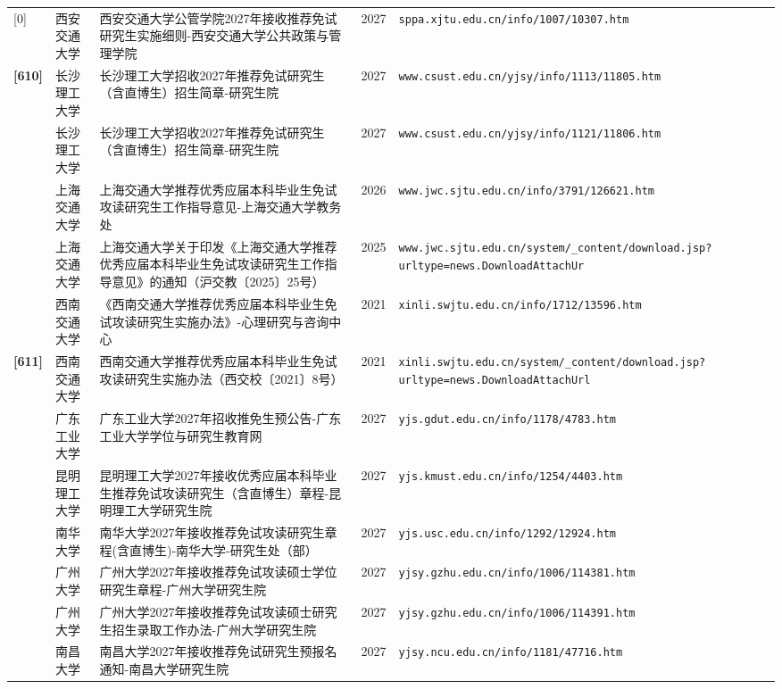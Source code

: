 {\begin{longtable}{@{}p{1.15cm}p{2.9cm}p{6.3cm}p{0.85cm}p{5.0cm}@{}}
[0] & 西安交通大学 & 西安交通大学公管学院2027年接收推荐免试研究生实施细则-西安交通大学公共政策与管理学院 & 2027 & \texttt{sppa.xjtu.edu.cn/info/1007/10307.htm} \\
\textbf{[610]} & 长沙理工大学 & 长沙理工大学招收2027年推荐免试研究生（含直博生）招生简章-研究生院 & 2027 & \texttt{www.csust.edu.cn/yjsy/info/1113/11805.htm} \\
[0] & 长沙理工大学 & 长沙理工大学招收2027年推荐免试研究生（含直博生）招生简章-研究生院 & 2027 & \texttt{www.csust.edu.cn/yjsy/info/1121/11806.htm} \\
[0] & 上海交通大学 & 上海交通大学推荐优秀应届本科毕业生免试攻读研究生工作指导意见-上海交通大学教务处 & 2026 & \texttt{www.jwc.sjtu.edu.cn/info/3791/126621.htm} \\
[0] & 上海交通大学 & 上海交通大学关于印发《上海交通大学推荐优秀应届本科毕业生免试攻读研究生工作指导意见》的通知（沪交教〔2025〕25号） & 2025 & \texttt{www.jwc.sjtu.edu.cn/system/\_content/download.jsp?urltype=news.DownloadAttachUr} \\
[0] & 西南交通大学 & 《西南交通大学推荐优秀应届本科毕业生免试攻读研究生实施办法》-心理研究与咨询中心 & 2021 & \texttt{xinli.swjtu.edu.cn/info/1712/13596.htm} \\
\textbf{[611]} & 西南交通大学 & 西南交通大学推荐优秀应届本科毕业生免试攻读研究生实施办法（西交校〔2021〕8号） & 2021 & \texttt{xinli.swjtu.edu.cn/system/\_content/download.jsp?urltype=news.DownloadAttachUrl} \\
[0] & 广东工业大学 & 广东工业大学2027年招收推免生预公告-广东工业大学学位与研究生教育网 & 2027 & \texttt{yjs.gdut.edu.cn/info/1178/4783.htm} \\
[0] & 昆明理工大学 & 昆明理工大学2027年接收优秀应届本科毕业生推荐免试攻读研究生（含直博生）章程-昆明理工大学研究生院 & 2027 & \texttt{yjs.kmust.edu.cn/info/1254/4403.htm} \\
[0] & 南华大学 & 南华大学2027年接收推荐免试攻读研究生章程(含直博生)-南华大学-研究生处（部） & 2027 & \texttt{yjs.usc.edu.cn/info/1292/12924.htm} \\
[0] & 广州大学 & 广州大学2027年接收推荐免试攻读硕士学位研究生章程-广州大学研究生院 & 2027 & \texttt{yjsy.gzhu.edu.cn/info/1006/114381.htm} \\
[0] & 广州大学 & 广州大学2027年接收推荐免试攻读硕士研究生招生录取工作办法-广州大学研究生院 & 2027 & \texttt{yjsy.gzhu.edu.cn/info/1006/114391.htm} \\
[0] & 南昌大学 & 南昌大学2027年接收推荐免试研究生预报名通知-南昌大学研究生院 & 2027 & \texttt{yjsy.ncu.edu.cn/info/1181/47716.htm} \\

\end{longtable}}
